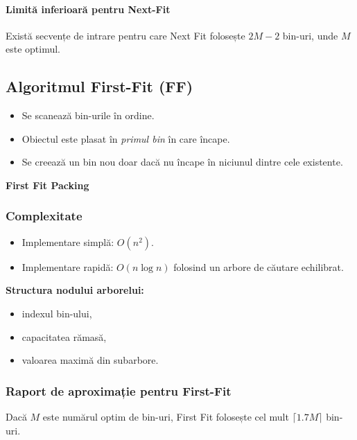 \documentclass[runningheads]{llncs}
\begin{document}
	\paragraph{Limită inferioară pentru Next-Fit}

	Există secvențe de intrare pentru care Next Fit folosește $2M - 2$ bin-uri, unde $M$ este optimul.

	\medskip

	\subsection{Algoritmul First-Fit (FF)}

	\begin{itemize}
		\item Se scanează bin-urile în ordine.
		\item Obiectul este plasat în \emph{primul bin} în care încape.
		\item Se creează un bin nou doar dacă nu încape în niciunul dintre cele existente.
	\end{itemize}

	\pagebreak
	\begin{center}
		\textbf{First Fit Packing}
	\end{center}

	\subsubsection{Complexitate}
	\begin{itemize}
		\item Implementare simplă: $O(n^2)$.
		\item Implementare rapidă: $O(n \log n)$ folosind un arbore de căutare echilibrat.
	\end{itemize}

	\textbf{Structura nodului arborelui:}
	\begin{itemize}
		\item indexul bin-ului,
		\item capacitatea rămasă,
		\item valoarea maximă din subarbore.
	\end{itemize}

	\subsubsection{Raport de aproximație pentru First-Fit}

	\begin{theorem}
		Dacă $M$ este numărul optim de bin-uri, First Fit folosește cel mult $\lceil 1.7 M \rceil$ bin-uri.
	\end{theorem}
\end{document}
